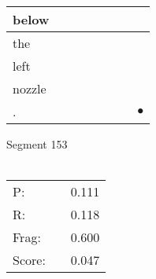 \documentclass[landscape]{article}
\newcommand{\ssp}{\hspace{2pt}}
\newcommand{\mex}{\cellcolor{g}$\bullet$}
\begin{document}
\begin{tabular}{|l|p{10pt}|p{10pt}|p{10pt}|p{10pt}|p{10pt}|p{10pt}|p{10pt}|}
\hline
\ssp below \ssp&\hspace{2pt}&\hspace{2pt}&\hspace{2pt}&\hspace{2pt}&\hspace{2pt}&\hspace{2pt}&\hspace{2pt}\\
\hline
\ssp the \ssp&\hspace{2pt}&\hspace{2pt}&\hspace{2pt}&\hspace{2pt}&\hspace{2pt}&\hspace{2pt}&\hspace{2pt}\\
\hline
\ssp left \ssp&\hspace{2pt}&\hspace{2pt}&\hspace{2pt}&\hspace{2pt}&\hspace{2pt}&\hspace{2pt}&\hspace{2pt}\\
\hline
\ssp nozzle \ssp&\hspace{2pt}&\hspace{2pt}&\hspace{2pt}&\hspace{2pt}&\hspace{2pt}&\hspace{2pt}&\hspace{2pt}\\
\hline
\ssp \cellcolor{ref6}. \ssp&\hspace{2pt}&\hspace{2pt}&\hspace{2pt}&\hspace{2pt}&\hspace{2pt}&\hspace{2pt}&\hspace{2pt}\mex\\
\hline
\end{tabular}

\vspace{6pt}
\noindent Segment 153\\\\
\noindent\begin{tabular}{lm{12pt}r}
\hline
P:&&0.111\\
R:&&0.118\\
Frag:&&0.600\\
Score:&&0.047\\
\end{tabular}
\end{document}

